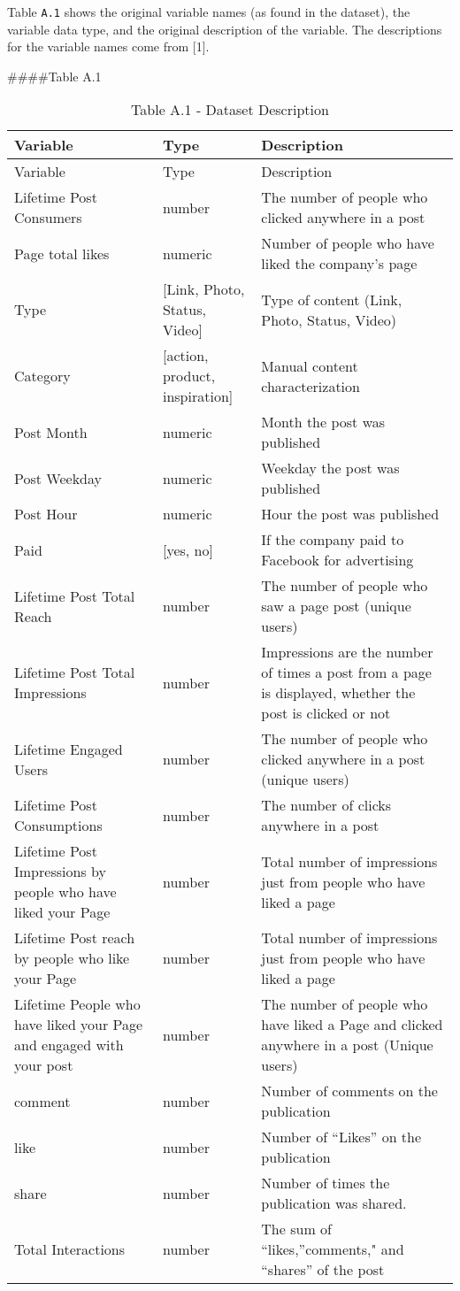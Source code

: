 \documentclass[
]{article}
\begin{document}
Table \texttt{A.1} shows the original variable names (as found in the
dataset), the variable data type, and the original description of the
variable. The descriptions for the variable names come from {[}1{]}.

\#\#\#\#Table A.1

\begin{longtable}[]{@{}lll@{}}
\caption{Table A.1 - Dataset Description}\tabularnewline
\toprule
Variable & Type & Description\tabularnewline
\midrule
\endfirsthead
\toprule
Variable & Type & Description\tabularnewline
\midrule
\endhead
Lifetime Post Consumers & number & The number of people who clicked
anywhere in a post\tabularnewline
Page total likes & numeric & Number of people who have liked the
company's page\tabularnewline
Type & {[}Link, Photo, Status, Video{]} & Type of content (Link, Photo,
Status, Video)\tabularnewline
Category & {[}action, product, inspiration{]} & Manual content
characterization\tabularnewline
Post Month & numeric & Month the post was published\tabularnewline
Post Weekday & numeric & Weekday the post was published\tabularnewline
Post Hour & numeric & Hour the post was published\tabularnewline
Paid & {[}yes, no{]} & If the company paid to Facebook for
advertising\tabularnewline
Lifetime Post Total Reach & number & The number of people who saw a page
post (unique users)\tabularnewline
Lifetime Post Total Impressions & number & Impressions are the number of
times a post from a page is displayed, whether the post is clicked or
not\tabularnewline
Lifetime Engaged Users & number & The number of people who clicked
anywhere in a post (unique users)\tabularnewline
Lifetime Post Consumptions & number & The number of clicks anywhere in a
post\tabularnewline
Lifetime Post Impressions by people who have liked your Page & number &
Total number of impressions just from people who have liked a
page\tabularnewline
Lifetime Post reach by people who like your Page & number & Total number
of impressions just from people who have liked a page\tabularnewline
Lifetime People who have liked your Page and engaged with your post &
number & The number of people who have liked a Page and clicked anywhere
in a post (Unique users)\tabularnewline
comment & number & Number of comments on the publication\tabularnewline
like & number & Number of ``Likes'' on the publication\tabularnewline
share & number & Number of times the publication was
shared.\tabularnewline
Total Interactions & number & The sum of ``likes,''comments," and
``shares'' of the post\tabularnewline
\bottomrule
\end{longtable}
\end{document}

